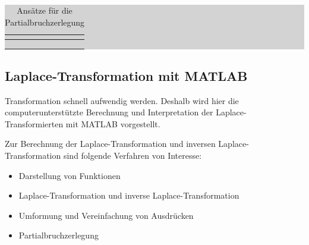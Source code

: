 \begin{table}[H]
\setlength{\arrayrulewidth}{.1em}
\caption{Ansätze für die Partialbruchzerlegung}

\setlength{\fboxsep}{0pt}%
\colorbox{lightgray}{%
%
\begin{tabular}{| c | c |}
\hline

\parbox[c][0.3in][c]{3in}{\smallskip\centering\textbf{\selectfont{Pollage}}} & \parbox[c][0.3in][c]{3in}{\smallskip\centering\textbf{\selectfont{Ansatz Partialbruchzerlegung}}}\\ \hline

\parbox[c][1in][c]{3in}{} & \parbox[c][1in][c]{3in}{}\\ \hline

\parbox[c][1in][c]{3in}{} & 
\parbox[c][1in][c]{3in}{}\\ \hline

\parbox[c][0.64in][c]{3in}{} & \parbox[c][0.64in][c]{3in}{}\\ 
\hline

\end{tabular}%
}
\label{tab:fourfive}
\end{table}

\clearpage
\subsection{Laplace-Transformation mit MATLAB}

Transformation schnell aufwendig werden. Deshalb wird hier die computerunterst\"{u}tzte Berechnung und Interpretation der Laplace-Transformierten mit MATLAB vorgestellt. 

\noindent Zur Berechnung der Laplace-Transformation und inversen Laplace-Transformation sind folgende Verfahren von Interesse:

\begin{itemize}
    \item Darstellung von Funktionen

    \item  Laplace-Transformation und inverse Laplace-Transformation 

    \item  Umformung und Vereinfachung von Ausdrücken

    \item  Partialbruchzerlegung 
\end{itemize}

